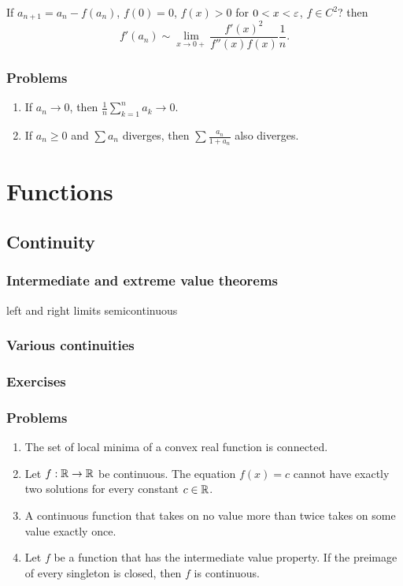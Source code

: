 \documentclass{../../large}
\begin{document}
\begin{prb}
If $a_{n+1}=a_n-f(a_n)$, $f(0)=0$, $f(x)>0$ for $0<x<\varepsilon$, $f\in C^2$? then
\[f'(a_n)\sim\lim_{x\to0+}\frac{f'(x)^2}{f''(x)f(x)}\frac1n.\]
\end{prb}
\section*{Problems}
\begin{enumerate}
\item If $a_n\to0$, then $\frac1n\sum_{k=1}^na_k\to0$.
\item If $a_n\ge0$ and $\sum a_n$ diverges, then $\sum\frac{a_n}{1+a_n}$ also diverges.
\end{enumerate}






\part{Functions}

\chapter{Continuity}
\section{Intermediate and extreme value theorems}

left and right limits
semicontinuous


\section{Various continuities}



\section*{Exercises}

\section*{Problems}
\begin{enumerate}
\item The set of local minima of a convex real function is connected.
\item Let $f:\mathbb{R}\to\mathbb{R}$ be continuous.
The equation $f(x)=c$ cannot have exactly two solutions for every constant $c\in\mathbb{R}$.
\item A continuous function that takes on no value more than twice takes on some value exactly once.
\item Let $f$ be a function that has the intermediate value property.
If the preimage of every singleton is closed, then $f$ is continuous.
\end{enumerate}
\end{document}
